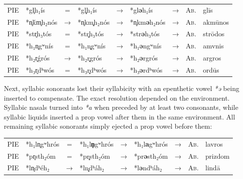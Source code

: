 \documentclass[svgnames,x11names,b5paper]{book}
\begin{document}
            \begin{table}[H]
                \begin{center}
                \begin{tabular}{llcllllll}
                \textsc{PIE} & *gl̥h₁ís & = & *gl\textbf{̥}h₁ís & → & *gl\textbf{ǝ}h₁ís & → & \textsc{Ab.} & glīs\\
                \textsc{PIE} & *n̥ḱm̥h₂nós & → & *n̥km\textbf{̥}h₂nós & → & *n̥km\textbf{ǝ}h₂nós & → & \textsc{Ab.} & akmūnos\\
                \textsc{PIE} & *str̥h₃tós & = & *str\textbf{̥}h₃tós & → & *str\textbf{ǝ}h₃tós & → & \textsc{Ab.} & strōdos\\
                \textsc{PIE} & *h₁n̥gʷnís & = & *h₁n\textbf{̥}gʷnís & → & *h₁\textbf{ǝ}ngʷnís & → & \textsc{Ab.} & amvnis\\
                \textsc{PIE} & *h₂r̥ǵrós & → & *h₂r\textbf{̥}grós & → & *h₂\textbf{ǝ}rgrós & → & \textsc{Ab.} & argros\\
                \textsc{PIE} & *h₃r̥dʰwós & = & *h₃r\textbf{̥}dʰwós & → & *h₃\textbf{ǝ}rdʰwós & → & \textsc{Ab.} & ordūs\\
                \end{tabular}
                \end{center}
                \end{table}
        
        Next, syllabic sonorants lost their syllabicity with an epenthetic vowel \textit{*ǝ} being inserted to compensate. The exact resolution depended on the environment. Syllabic nasals turned into \textit{*a} when preceded by at least two consonants, while syllabic liquids inserted a prop vowel after them in the same environment. All remaining syllabic sonorants simply ejected a prop vowel before them:

            \begin{table}[H]
                \begin{center}
                \begin{tabular}{llcllllll}
                \textsc{PIE} & *h₁ln̥gʷhrós & = & *h₁l\textbf{n̥}gʷhrós & → & *h₁l\textbf{a}gʷhrós & → & \textsc{Ab.} & lavros\\
                \textsc{PIE} & *pr̥sth₂óm & = & *pr\textbf{̥}sth₂óm & → & *pr\textbf{ǝ}sth₂óm & → & \textsc{Ab.} & prizdom\\
                \textsc{PIE} & *ln̥dʰéh₂ & → & *ln\textbf{̥}dʰáh₂ & → & *l\textbf{ǝ}ndʰáh₂ & → & \textsc{Ab.} & lindā\\
                \end{tabular}
                \end{center}
                \end{table}
        
\end{document}
